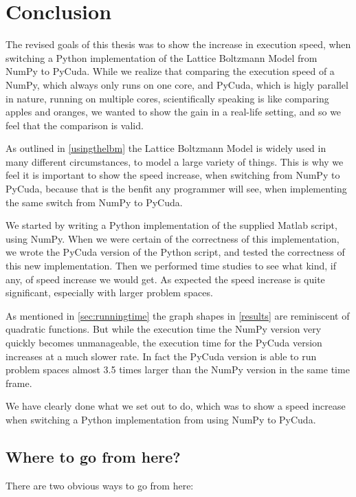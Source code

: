\newpage
\section{Conclusion}

The revised goals of this thesis was to show the increase in execution speed, when switching a Python implementation of the Lattice Boltzmann Model from NumPy to PyCuda. While we realize that comparing the execution speed of a NumPy, which always only runs on one core, and PyCuda, which is higly parallel in nature, running on multiple cores, scientifically speaking is like comparing apples and oranges, we wanted to show the gain in a real-life setting, and so we feel that the comparison is valid.

As outlined in \autoref{usingthelbm} the Lattice Boltzmann Model is widely used in many different circumstances, to model a large variety of things. This is why we feel it is important to show the speed increase, when switching from NumPy to PyCuda, because that is the benfit any programmer will see, when implementing the same switch from NumPy to PyCuda.

We started by writing a Python implementation of the supplied Matlab script, using NumPy. When we were certain of the correctness of this implementation, we wrote the PyCuda version of the Python script, and tested the correctness of this new implementation. Then we performed time studies to see what kind, if any, of speed increase we would get. As expected the speed increase is quite significant, especially with larger problem spaces.

As mentioned in \autoref{sec:runningtime} the graph shapes in \autoref{results} are reminiscent of quadratic functions. But while the execution time the NumPy version very quickly becomes unmanageable, the execution time for the PyCuda version increases at a much slower rate. In fact the PyCuda version is able to run problem spaces almost 3.5 times larger than the NumPy version in the same time frame.

We have clearly done what we set out to do, which was to show a speed increase when switching a Python implementation from using NumPy to PyCuda.

\subsection{Where to go from here?}

There are two obvious ways to go from here:

